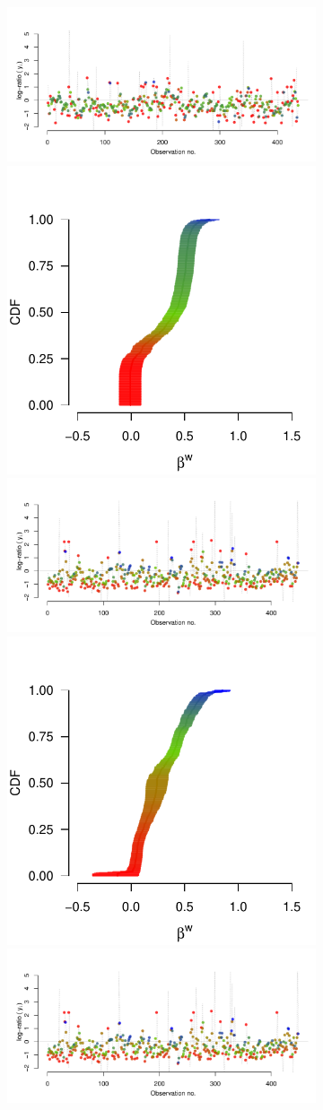 \documentclass[9pt,twoside,lineno]{pnas-new}
\begin{document}
\begin{figure}
	\centering
	\begin{subfigure}{.44\linewidth}
		\includegraphics[width=.7\linewidth]{thread_history_1097_1.pdf}	
		\includegraphics[width=.28\linewidth]{beta_history_1097_1.pdf}	
		\includegraphics[width=.7\linewidth]{thread_history_1097_1_extra.pdf}	
		\includegraphics[width=.28\linewidth]{beta_history_1097_1_extra.pdf}
		\includegraphics[width=.7\linewidth]{thread_history_1097_1_extra.pdf}	

\end{subfigure}
\end{figure}
\end{document}
